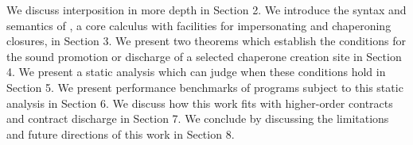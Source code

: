 \documentclass{sigplanconf}
\begin{document}



We discuss interposition in more depth in Section 2.
We introduce the syntax and semantics of \chapcalc, a core calculus with facilities for impersonating and chaperoning closures, in Section 3.
We present two theorems which establish the conditions for the sound promotion or discharge of a selected chaperone creation site in Section 4.
We present a static analysis which can judge when these conditions hold in Section 5.
We present performance benchmarks of programs subject to this static analysis in Section 6.
We discuss how this work fits with higher-order contracts and contract discharge in Section 7.
We conclude by discussing the limitations and future directions of this work in Section 8.


\end{document}
